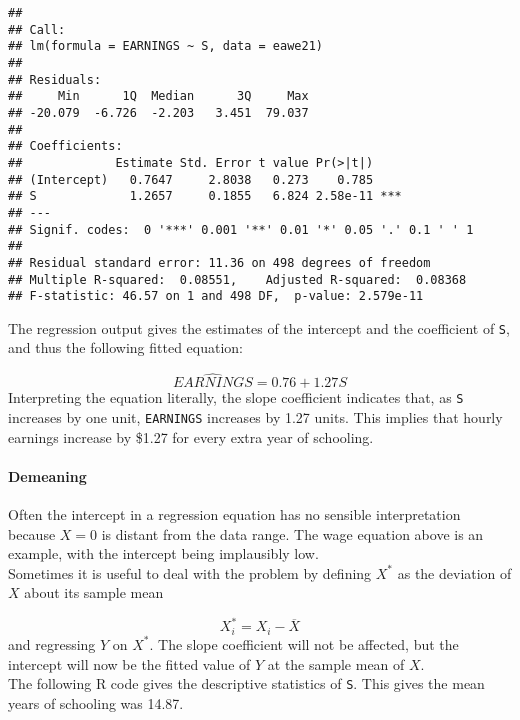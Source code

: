 \documentclass[
]{article}
\newenvironment{Shaded}{\begin{snugshade}}{\end{snugshade}}
\newcommand{\CommentTok}[1]{\textcolor[rgb]{0.56,0.35,0.01}{\textit{#1}}}
\newcommand{\FunctionTok}[1]{\textcolor[rgb]{0.00,0.00,0.00}{#1}}
\newcommand{\NormalTok}[1]{#1}
\newcommand{\SpecialCharTok}[1]{\textcolor[rgb]{0.00,0.00,0.00}{#1}}
\begin{document}
\begin{verbatim}
## 
## Call:
## lm(formula = EARNINGS ~ S, data = eawe21)
## 
## Residuals:
##     Min      1Q  Median      3Q     Max 
## -20.079  -6.726  -2.203   3.451  79.037 
## 
## Coefficients:
##             Estimate Std. Error t value Pr(>|t|)    
## (Intercept)   0.7647     2.8038   0.273    0.785    
## S             1.2657     0.1855   6.824 2.58e-11 ***
## ---
## Signif. codes:  0 '***' 0.001 '**' 0.01 '*' 0.05 '.' 0.1 ' ' 1
## 
## Residual standard error: 11.36 on 498 degrees of freedom
## Multiple R-squared:  0.08551,    Adjusted R-squared:  0.08368 
## F-statistic: 46.57 on 1 and 498 DF,  p-value: 2.579e-11
\end{verbatim}

The regression output gives the estimates of the intercept and the
coefficient of \texttt{S}, and thus the following fitted equation:

\[\hat{EARNINGS}=0.76+1.27S\] Interpreting the equation literally, the
slope coefficient indicates that, as \texttt{S} increases by one unit,
\texttt{EARNINGS} increases by 1.27 units. This implies that hourly
earnings increase by \$1.27 for every extra year of schooling.

\hypertarget{demeaning}{%
\paragraph{Demeaning}\label{demeaning}}

Often the intercept in a regression equation has no sensible
interpretation because \(X=0\) is distant from the data range. The wage
equation above is an example, with the intercept being implausibly
low.\\
Sometimes it is useful to deal with the problem by defining \(X^*\) as
the deviation of \(X\) about its sample mean

\[X_{i}^{*}=X_i-\overline{X}\] and regressing \(Y\) on \(X^*\). The
slope coefficient will not be affected, but the intercept will now be
the fitted value of \(Y\) at the sample mean of \(X\).\\
The following R code gives the descriptive statistics of \texttt{S}.
This gives the mean years of schooling was 14.87.

\begin{Shaded}
\end{Shaded}
\end{document}
